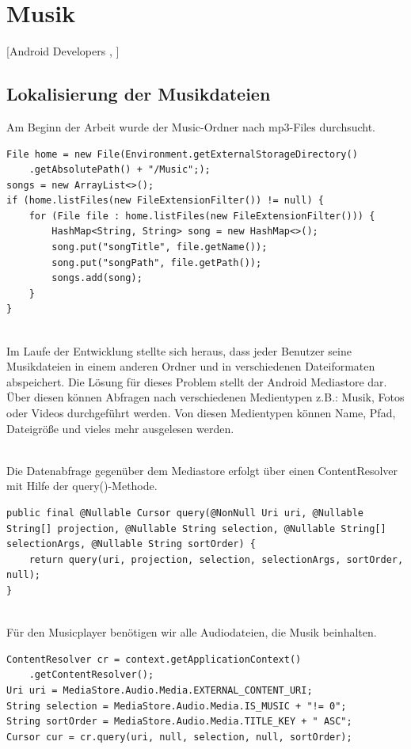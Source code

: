 \documentclass[FIPLY_base.tex]{subfiles}
\author{Andreas Denkmayr}
\date{19. Februar 2016}
\begin{document}
\section{Musik}
[Android Developers \cite{adMediaPlayer}, \citeauthor{bMediaPlayer} \cite{bMediaPlayer}]

\subsection{Lokalisierung der Musikdateien}
Am Beginn der Arbeit wurde der Music-Ordner nach mp3-Files durchsucht.
\begin{lstlisting}
File home = new File(Environment.getExternalStorageDirectory()
	.getAbsolutePath() + "/Music";);
songs = new ArrayList<>();
if (home.listFiles(new FileExtensionFilter()) != null) {
	for (File file : home.listFiles(new FileExtensionFilter())) {
		HashMap<String, String> song = new HashMap<>();
		song.put("songTitle", file.getName());
		song.put("songPath", file.getPath());
		songs.add(song);
	}
}    
\end{lstlisting}

\ \\
Im Laufe der Entwicklung stellte sich heraus, dass jeder Benutzer seine Musikdateien in einem anderen Ordner und in verschiedenen Dateiformaten abspeichert. 
Die Lösung für dieses Problem stellt der Android Mediastore dar. 
Über diesen können Abfragen nach verschiedenen Medientypen z.B.: Musik, Fotos oder Videos durchgeführt werden. Von diesen Medientypen können Name, Pfad, Dateigröße und vieles mehr ausgelesen werden.
  
\ \\  
Die Datenabfrage gegenüber dem Mediastore erfolgt über einen ContentResolver mit Hilfe der query()-Methode.
\begin{lstlisting}
public final @Nullable Cursor query(@NonNull Uri uri, @Nullable String[] projection, @Nullable String selection, @Nullable String[] selectionArgs, @Nullable String sortOrder) {
	return query(uri, projection, selection, selectionArgs, sortOrder, null);
}
\end{lstlisting}

\ \\
Für den Musicplayer benötigen wir alle Audiodateien, die Musik beinhalten.
\begin{lstlisting}
ContentResolver cr = context.getApplicationContext()
	.getContentResolver();
Uri uri = MediaStore.Audio.Media.EXTERNAL_CONTENT_URI;
String selection = MediaStore.Audio.Media.IS_MUSIC + "!= 0";
String sortOrder = MediaStore.Audio.Media.TITLE_KEY + " ASC";
Cursor cur = cr.query(uri, null, selection, null, sortOrder);
\end{lstlisting}
\end{document}

